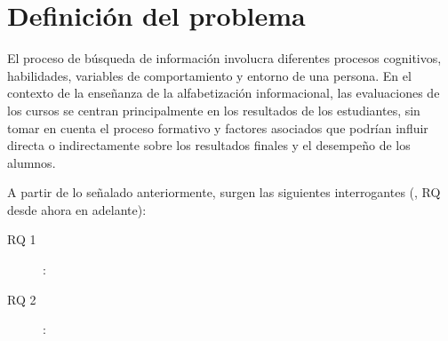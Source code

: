 \section{Definición del problema}
\label{sec:definicion_problema}
El proceso de búsqueda de información involucra diferentes procesos cognitivos, habilidades, variables de comportamiento y entorno de una persona. En el contexto de la enseñanza de la alfabetización informacional, las evaluaciones de los cursos se centran principalmente en los resultados de los estudiantes, sin tomar en cuenta el proceso formativo y factores asociados que podrían influir directa o indirectamente sobre los resultados finales y el desempeño de los alumnos.  

A partir de lo señalado anteriormente, surgen las siguientes interrogantes (, RQ desde ahora en adelante):

\begin{description}
	\item [RQ 1]: 
	\item [RQ 2]:
\end{description}